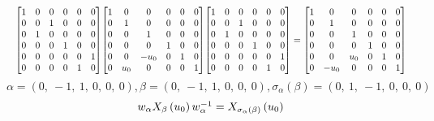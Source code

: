 \documentclass[11pt]{article}
\theoremstyle{definition}
\begin{document}
\[
\scaletoalign{\textwidth}{{\left[\begin{matrix}1 & 0 & 0 & 0 & 0 & 0\\0 & 0 & 1 & 0 & 0 & 0\\0 & 1 & 0 & 0 & 0 & 0\\0 & 0 & 0 & 1 & 0 & 0\\0 & 0 & 0 & 0 & 0 & 1\\0 & 0 & 0 & 0 & 1 & 0\end{matrix}\right]} {\left[\begin{matrix}1 & 0 & 0 & 0 & 0 & 0\\0 & 1 & 0 & 0 & 0 & 0\\0 & 0 & 1 & 0 & 0 & 0\\0 & 0 & 0 & 1 & 0 & 0\\0 & 0 & - u_{0} & 0 & 1 & 0\\0 & u_{0} & 0 & 0 & 0 & 1\end{matrix}\right]} {\left[\begin{matrix}1 & 0 & 0 & 0 & 0 & 0\\0 & 0 & 1 & 0 & 0 & 0\\0 & 1 & 0 & 0 & 0 & 0\\0 & 0 & 0 & 1 & 0 & 0\\0 & 0 & 0 & 0 & 0 & 1\\0 & 0 & 0 & 0 & 1 & 0\end{matrix}\right]} = {\left[\begin{matrix}1 & 0 & 0 & 0 & 0 & 0\\0 & 1 & 0 & 0 & 0 & 0\\0 & 0 & 1 & 0 & 0 & 0\\0 & 0 & 0 & 1 & 0 & 0\\0 & 0 & u_{0} & 0 & 1 & 0\\0 & - u_{0} & 0 & 0 & 0 & 1\end{matrix}\right]}}
\]
\[
\alpha = \left( 0, \  -1, \  1, \  0, \  0, \  0\right), \beta = \left( 0, \  -1, \  1, \  0, \  0, \  0\right), \sigma_{\alpha}(\beta) = \left( 0, \  1, \  -1, \  0, \  0, \  0\right)
\]
\[
\scaletoalign{\textwidth}{w_{\alpha} X_{\beta}\left(u_{0}\right) w_{\alpha}^{-1} = X_{\sigma_{\alpha}\left(\beta\right)}\left(u_{0}\right)}
\]
\end{document}
